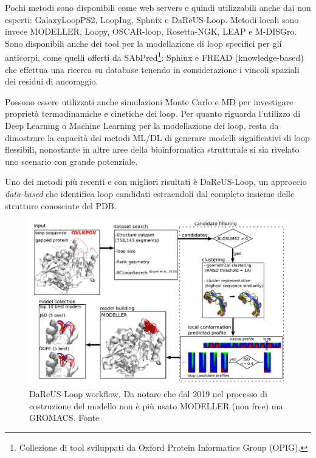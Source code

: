 {{\par Pochi metodi sono disponibili come web servers e quindi utilizzabili anche dai non esperti: GalaxyLoopPS2, LoopIng, Sphnix e DaReUS-Loop. Metodi locali sono invece MODELLER, Loopy, OSCAR-loop, Rosetta-NGK, LEAP e M-DISGro. Sono disponibili anche dei tool per la modellazione di loop specifici per gli anticorpi, come quelli offerti da SAbPred\footnote{Collezione di tool sviluppati da Oxford Protein Informatics Group (OPIG).}: Sphinx e FREAD (knowledge-based) che effettua una ricerca su database tenendo in considerazione i vincoli spaziali dei residui di ancoraggio.

\par Possono essere utilizzati anche simulazioni Monte Carlo e MD per investigare proprietà termodinamiche e cinetiche dei loop. Per quanto riguarda l'utilizzo di Deep Learning o Machine Learning per la modellazione dei loop, resta da dimostrare la capacità dei metodi ML/DL di generare modelli significativi di loop flessibili, nonostante in altre aree della bioinformatica strutturale si sia rivelato uno scenario con grande potenziale\supercite{barozet2021current}.

\par Uno dei metodi più recenti e con migliori risultati è DaReUS-Loop, un approccio  \textit{data-based} che identifica loop candidati estraendoli dal completo insieme delle strutture conosciute del PDB. 

\begin{figure}[!htb]
	\centering
	\includegraphics[scale=0.45]{images/dareus.png}
	\caption{DaReUS-Loop workflow. Da notare che dal 2019\supercite{karamiLoop} nel processo di costruzione del modello non è più usato MODELLER (non free) ma GROMACS. Fonte\cite{karami2018dareus}}
	\label{fig:dareus-workflow}
\end{figure}

}}
